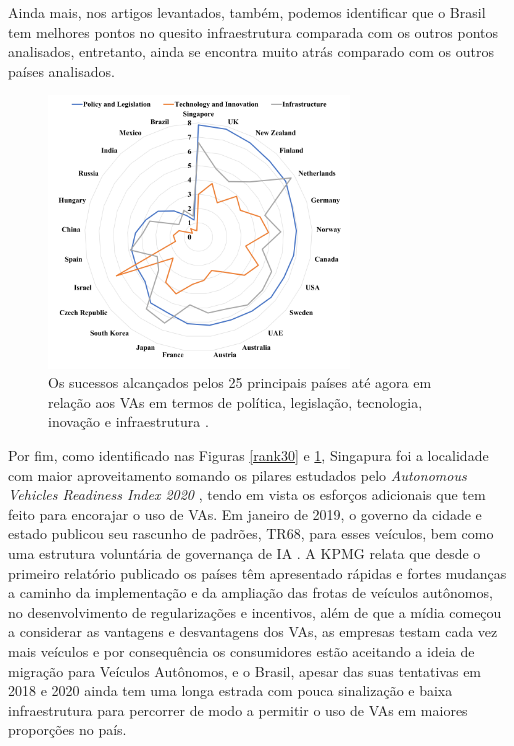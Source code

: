 Ainda mais, nos artigos levantados, também, podemos identificar que o Brasil tem melhores pontos no quesito infraestrutura comparada com os outros pontos analisados, entretanto, ainda se encontra muito atrás comparado com os outros países analisados.
\begin{figure}[H]
\centering
\includegraphics[width=8cm]{Figures/future.png}
\caption{Os sucessos alcançados pelos 25 principais países até agora em relação aos VAs em termos de política, legislação, tecnologia, inovação e infraestrutura \cite{future-view}.}
\label{figura_future-view}
\end{figure}

Por fim, como identificado nas Figuras \ref{rank30} e \ref{figura_future-view}, Singapura foi a localidade com maior aproveitamento somando os pilares estudados pelo \textit{Autonomous Vehicles Readiness Index 2020} \cite{KPMG}, tendo em vista os esforços adicionais que tem feito para encorajar o uso de VAs. Em janeiro de 2019, o governo da cidade e estado publicou seu rascunho de padrões, TR68, para esses veículos, bem como uma estrutura voluntária de governança de IA \cite{KPMG}. A KPMG relata que desde o primeiro relatório publicado os países têm apresentado rápidas e fortes mudanças a caminho da implementação e da ampliação das frotas de veículos autônomos, no desenvolvimento de regularizações e incentivos, além de que a mídia começou a considerar as vantagens e desvantagens dos VAs, as empresas testam cada vez mais veículos e por consequência os consumidores estão aceitando a ideia de migração para Veículos Autônomos, e o Brasil, apesar das suas tentativas em 2018 e 2020 ainda tem uma longa estrada com pouca sinalização e baixa infraestrutura para percorrer de modo a permitir o uso de VAs em maiores proporções no país.
\newpage
